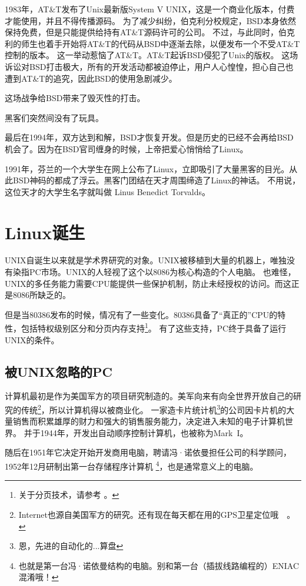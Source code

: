 1983年，AT\&T发布了Unix最新版System V UNIX，这是一个商业化版本，付费才能使用，并且不得传播源码。
为了减少纠纷，伯克利分校规定，BSD本身依然保持免费，但是只能提供给持有AT\&T源码许可的公司。
不过，与此同时，伯克利的师生也着手开始将AT\&T的代码从BSD中逐渐去除，以便发布一个不受AT\&T控制的版本。
这一举动惹恼了AT\&T。AT\&T起诉BSD侵犯了Unix的版权。
这场诉讼对BSD打击极大，所有的开发活动都被迫停止，用户人心惶惶，担心自己也遭到AT\&T的追究，因此BSD的使用急剧减少。

这场战争给BSD带来了毁灭性的打击。


黑客们突然间没有了玩具。

最后在1994年，双方达到和解，BSD才恢复开发。但是历史的已经不会再给BSD机会了。因为在BSD官司缠身的时候，上帝把爱心悄悄给了Linux。

1991年，芬兰的一个大学生在网上公布了Linux，立即吸引了大量黑客的目光。从此BSD神码的都成了浮云。黑客门团结在天才周围缔造了Linux的神话。
不用说，这位天才的大学生名字就叫做 Linus Benedict Torvalds。

\section{Linux诞生}

UNIX自诞生以来就是学术界研究的对象。UNIX被移植到大量的机器上，唯独没有染指PC市场。UNIX的人轻视了这个以8086为核心构造的个人电脑。
也难怪，UNIX的多任务能力需要CPU能提供一些保护机制，防止未经授权的访问。而这正是8086所缺乏的。

但是当80386发布的时候，情况有了一些变化。80386具备了“真正的”CPU的特性，包括特权级别区分和分页内存支持\footnote{关于分页技术，请参考 。}。 有了这些支持，PC终于具备了运行UNIX的条件。

\subsection{被UNIX忽略的PC}
计算机最初是作为美国军方的项目研究制造的。美军向来有向全世界开放自己的研究的传统\footnote{Internet也源自美国军方的研究。还有现在每天都在用的GPS卫星定位哦~~。}，所以计算机得以被商业化。
一家造卡片统计机\footnote{恩，先进的自动化的...算盘}的公司因卡片机的大量销售而积累雄厚的财力和强大的销售服务能力，决定进入未知的电子计算机世界。
并于1944年，开发出自动顺序控制计算机，也被称为Mark~I。


随后在1951年它决定开始开发商用电脑，聘请冯·诺依曼担任公司的科学顾问，1952年12月研制出第一台存储程序计算机
\footnote{也就是第一台冯·诺依曼结构的电脑。别和第一台（插拔线路编程的）ENIAC混淆哦！}，也是通常意义上的电脑。

